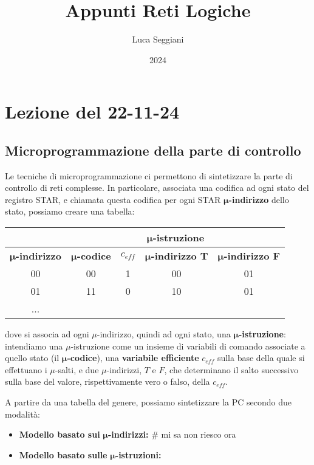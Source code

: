 \documentclass[a4paper,11pt]{article}
\title{Appunti Reti Logiche}
\author{Luca Seggiani}
\date{2024}
\begin{document}
\section{Lezione del 22-11-24}

\thispagestyle{empty}
\pagestyle{fancy}

\subsection{Microprogrammazione della parte di controllo}
Le tecniche di microprogrammazione ci permettono di sintetizzare la parte di controllo di reti complesse.
In particolare, associata una codifica ad ogni stato del registro STAR, e chiamata questa codifica per ogni STAR $\boldsymbol{\mu}$\textbf{-indirizzo} dello stato, possiamo creare una tabella:
\begin{table}[H]
	\center 
	\begin{tabular} { c | c  c  c  c }
		& \multicolumn{4}{c}{$\boldsymbol{\mu}$\bfseries -istruzione} \\ 
		\hline
		$\boldsymbol{\mu}$\bfseries-{indirizzo} & 
		$\boldsymbol{\mu}$\bfseries-{codice} & 
		$c_{eff}$ & 
		$\boldsymbol{\mu}$\bfseries-{indirizzo T} & 
		$\boldsymbol{\mu}$\bfseries-{indirizzo F} \\
		\hline 
		00 & 00 & 1 & 00 & 01 \\ 
		01 & 11 & 0 & 10 & 01 \\ 
		...
	\end{tabular}
\end{table}

dove si associa ad ogni $\mu$-indirizzo, quindi ad ogni stato, una $\boldsymbol{\mu}$\textbf{-istruzione}: intendiamo una $\mu$-istruzione come un insieme di variabili di comando associate a quello stato (il $\boldsymbol{\mu}$\textbf{-codice}), una \textbf{variabile efficiente} $c_{eff}$ sulla base della quale si effettuano i $\mu$-salti, e due $\mu$-indirizzi, $T$ e $F$, che determinano il salto successivo sulla base del valore, rispettivamente vero o falso, della $c_{eff}$.

A partire da una tabella del genere, possiamo sintetizzare la PC secondo due modalità:
\begin{itemize}
	\item \textbf{Modello basato sui} $\boldsymbol{\mu}$\textbf{-indirizzi:}
		# mi sa non riesco ora
	\item \textbf{Modello basato sulle} $\boldsymbol{\mu}$\textbf{-istruzioni:}
\end{itemize}
\end{document}
